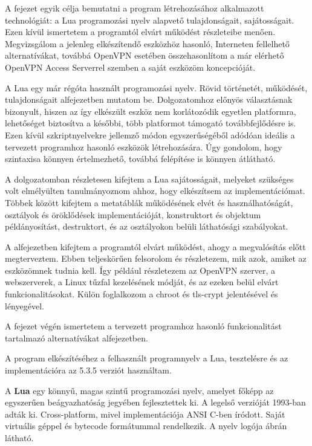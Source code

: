 
A fejezet egyik célja bemutatni a program létrehozásához alkalmazott technológiát: a Lua programozási nyelv alapvető tulajdonságait, sajátosságait.
Ezen kívül ismertetem a programtól elvárt működést részleteibe menően.
Megvizsgálom a jelenleg elkészítendő eszközhöz hasonló, Interneten fellelhető alternatívákat, továbbá OpenVPN esetében összehasonlítom a már elérhető OpenVPN Access Serverrel szemben a saját eszközöm koncepcióját.

A Lua egy már régóta használt programozási nyelv. Rövid történetét, működését, tulajdonságait  alfejezetben mutatom be.
Dolgozatomhoz előnyös választásnak bizonyult, hiszen az így elkészült eszköz nem korlátozódik egyetlen platformra, lehetőséget biztosítva a későbbi, több platformot támogató továbbfejlődésre is.
Ezen kívül szkriptnyelvekre jellemző módon egyszerűségéből adódóan ideális a tervezett programhoz hasonló eszközök létrehozására. Úgy gondolom, hogy szintaxisa könnyen értelmezhető, továbbá felépítése is könnyen átlátható.

A dolgozatomban részletesen kifejtem a Lua sajátosságait, melyeket szükséges volt elmélyülten tanulmányoznom ahhoz, hogy elkészítsem az implementációmat.
Többek között kifejtem a metatáblák működésének elvét és használhatóságát, osztályok és öröklődések implementációját, konstruktort és objektum példányosítást, destruktort, és az osztályokon belüli láthatósági szabályokat.

A  alfejezetben kifejtem a programtól elvárt működést, ahogy a megvalósítás előtt megterveztem.
Ebben teljeskörűen felsorolom és részletezem, mik azok, amiket az eszközömnek tudnia kell.
Így például részletezem az OpenVPN szerver, a webszerverek, a Linux tűzfal kezelésének módját, és az ezeken belül elvárt funkcionalitásokat.
Külön foglalkozom a chroot és tls-crypt jelentésével és lényegével.

A fejezet végén ismertetem a tervezett programhoz hasonló funkcionalitást tartalmazó alternatívákat  alfejezetben.

\label{sect:used_language}
A program elkészítéséhez a felhasznált programnyelv a Lua, tesztelésre és az implementációra az 5.3.5 verziót használtam.

A \textbf{Lua} egy könnyű, magas szintű programozási nyelv, amelyet főképp az egyszerűen beágyazhatóság jegyében fejlesztettek ki. A legelső verzióját 1993-ban adták ki. Cross-platform, mivel implementációja ANSI C-ben íródott. Saját virtuális géppel és bytecode formátummal rendelkezik. A nyelv logója  ábrán látható.


